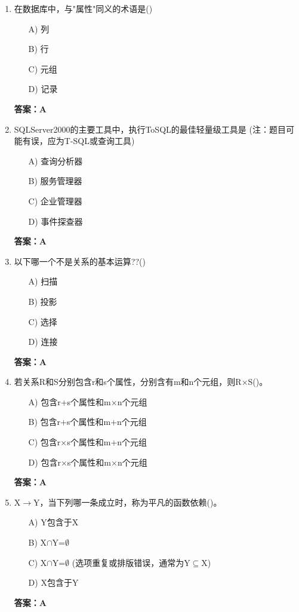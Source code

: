 \documentclass[a4paper,12pt]{article}
\begin{document}
\begin{enumerate}[label=\arabic*.]
\item 在数据库中，与"属性"同义的术语是()
\begin{itemize}
    \item[A)] 列
    \item[B)] 行
    \item[C)] 元组
    \item[D)] 记录
\end{itemize}
\textbf{答案：A}

\item SQLServer2000的主要工具中，执行ToSQL的最佳轻量级工具是 (注：题目可能有误，应为T-SQL或查询工具)
\begin{itemize}
    \item[A)] 查询分析器
    \item[B)] 服务管理器
    \item[C)] 企业管理器
    \item[D)] 事件探查器
\end{itemize}
\textbf{答案：A}

\item 以下哪一个不是关系的基本运算??()
\begin{itemize}
    \item[A)] 扫描
    \item[B)] 投影
    \item[C)] 选择
    \item[D)] 连接
\end{itemize}
\textbf{答案：A}

\item 若关系R和S分别包含r和s个属性，分别含有m和n个元组，则R$\times$S()。
\begin{itemize}
    \item[A)] 包含r+s个属性和m$\times$n个元组
    \item[B)] 包含r+s个属性和m+n个元组
    \item[C)] 包含r$\times$s个属性和m+n个元组
    \item[D)] 包含r$\times$s个属性和m$\times$n个元组
\end{itemize}
\textbf{答案：A}

\item X$\to$Y，当下列哪一条成立时，称为平凡的函数依赖()。
\begin{itemize}
    \item[A)] Y包含于X
    \item[B)] X$\cap$Y=$\emptyset$
    \item[C)] X$\cap$Y=$\emptyset$ (选项重复或排版错误，通常为Y$\subseteq$X)
    \item[D)] X包含于Y
\end{itemize}
\textbf{答案：A}


\end{enumerate}
\end{document}
